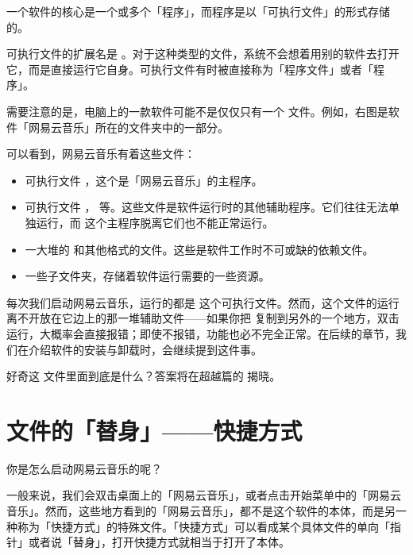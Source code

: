 {{一个软件的核心是一个或多个「程序」，而程序是以「可执行文件」的形式存储的。

可执行文件的扩展名是  。对于这种类型的文件，系统不会想着用别的软件去打开它，而是直接运行它自身。可执行文件有时被直接称为「程序文件」或者「程序」。

需要注意的是，电脑上的一款软件可能不是仅仅只有一个  文件。例如，右图是软件「网易云音乐」所在的文件夹中的一部分。

可以看到，网易云音乐有着这些文件：

\begin{itemize}
  \item 可执行文件  ，这个是「网易云音乐」的主程序。
  \item 可执行文件 ， 等。这些文件是软件运行时的其他辅助程序。它们往往无法单独运行，而  这个主程序脱离它们也不能正常运行。
  \item 一大堆的  和其他格式的文件。这些是软件工作时不可或缺的依赖文件。
  \item 一些子文件夹，存储着软件运行需要的一些资源。
\end{itemize}

每次我们启动网易云音乐，运行的都是  这个可执行文件。然而，这个文件的运行离不开放在它边上的那一堆辅助文件——如果你把  复制到另外的一个地方，双击运行，大概率会直接报错；即使不报错，功能也必不完全正常。在后续的章节，我们在介绍软件的安装与卸载时，会继续提到这件事。

\begin{note}
  好奇这  文件里面到底是什么？答案将在超越篇的 揭晓。
\end{note}

\section{文件的「替身」——快捷方式}

你是怎么启动网易云音乐的呢？

一般来说，我们会双击桌面上的「网易云音乐」，或者点击开始菜单中的「网易云音乐」。然而，这些地方看到的「网易云音乐」，都不是这个软件的本体，而是另一种称为「快捷方式」的特殊文件。「快捷方式」可以看成某个具体文件的单向「指针」或者说「替身」，打开快捷方式就相当于打开了本体。

}}
